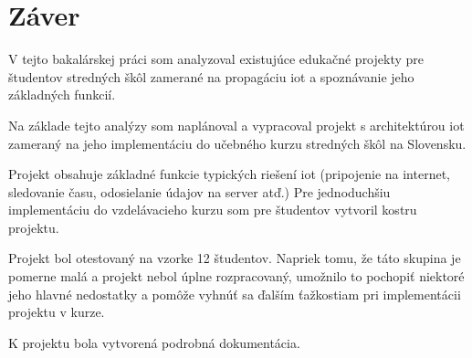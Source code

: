 
\chapter{Záver}
\label{summary}

V tejto bakalárskej práci som analyzoval existujúce edukačné projekty pre študentov stredných škôl zamerané na propagáciu \gls{iot} a spoznávanie jeho základných funkcií.  

Na základe tejto analýzy som naplánoval a vypracoval projekt s architektúrou \gls{iot} zameraný na jeho implementáciu do učebného kurzu stredných škôl na Slovensku.

Projekt obsahuje základné funkcie typických riešení \gls{iot} (pripojenie na internet, sledovanie času, odosielanie údajov na server atď.) Pre jednoduchšiu implementáciu do vzdelávacieho kurzu som pre študentov vytvoril kostru projektu. 

Projekt bol otestovaný na vzorke 12 študentov. Napriek tomu, že táto skupina je pomerne malá a projekt nebol úplne rozpracovaný, umožnilo to pochopiť niektoré jeho hlavné nedostatky a pomôže vyhnúť sa ďalším ťažkostiam pri implementácii projektu v kurze.

K projektu bola vytvorená podrobná dokumentácia.